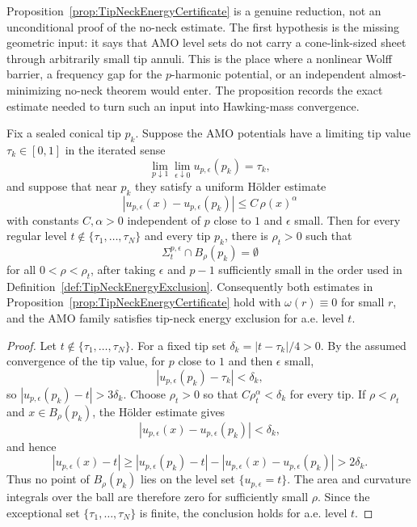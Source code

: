 \begin{remark}\label{rem:TipNeckCertificateStatus}
Proposition~\ref{prop:TipNeckEnergyCertificate} is a genuine reduction, not an
unconditional proof of the no-neck estimate.  The first hypothesis is the
missing geometric input: it says that AMO level sets do not carry a
cone-link-sized sheet through arbitrarily small tip annuli.  This is the
place where a nonlinear Wolff barrier, a frequency gap for the \(p\)-harmonic
potential, or an independent almost-minimizing no-neck theorem would enter.
The proposition records the exact estimate needed to turn such an input into
Hawking-mass convergence.
\end{remark}

\begin{proposition}
\label{prop:TipValueSeparationNoNeck}
Fix a sealed conical tip \(p_k\).  Suppose the AMO potentials have a limiting
tip value \(\tau_k\in[0,1]\) in the iterated sense
\[
    \lim_{p\downarrow1}\lim_{\epsilon\downarrow0}
    u_{p,\epsilon}(p_k)=\tau_k,
\]
and suppose that near \(p_k\) they satisfy a uniform H\"older estimate
\[
    |u_{p,\epsilon}(x)-u_{p,\epsilon}(p_k)|
    \le C\,\rho(x)^\alpha
\]
with constants \(C,\alpha>0\) independent of \(p\) close to \(1\) and
\(\epsilon\) small.  Then for every regular level
\(t\notin\{\tau_1,\ldots,\tau_N\}\) and every tip \(p_k\), there is
\(\rho_t>0\) such that
\[
    \Sigma^{p,\epsilon}_t\cap B_\rho(p_k)=\emptyset
\]
for all \(0<\rho<\rho_t\), after taking \(\epsilon\) and \(p-1\) sufficiently
small in the order used in Definition~\ref{def:TipNeckEnergyExclusion}.
Consequently both estimates in Proposition~\ref{prop:TipNeckEnergyCertificate}
hold with \(\omega(r)\equiv0\) for small \(r\), and the AMO family satisfies
tip-neck energy exclusion for a.e. level \(t\).
\end{proposition}

\begin{proof}
Let \(t\notin\{\tau_1,\ldots,\tau_N\}\).  For a fixed tip set
\(\delta_k=|t-\tau_k|/4>0\).  By the assumed convergence of the tip value,
for \(p\) close to \(1\) and then \(\epsilon\) small,
\[
    |u_{p,\epsilon}(p_k)-\tau_k|<\delta_k,
\]
so \(|u_{p,\epsilon}(p_k)-t|>3\delta_k\).  Choose
\(\rho_t>0\) so that \(C\rho_t^\alpha<\delta_k\) for every tip.  If
\(\rho<\rho_t\) and \(x\in B_\rho(p_k)\), the H\"older estimate gives
\[
    |u_{p,\epsilon}(x)-u_{p,\epsilon}(p_k)|<\delta_k,
\]
and hence
\[
    |u_{p,\epsilon}(x)-t|
    \ge |u_{p,\epsilon}(p_k)-t|
      - |u_{p,\epsilon}(x)-u_{p,\epsilon}(p_k)|
    >2\delta_k .
\]
Thus no point of \(B_\rho(p_k)\) lies on the level set
\(\{u_{p,\epsilon}=t\}\).  The area and curvature integrals over the ball are
therefore zero for sufficiently small \(\rho\).  Since the exceptional set
\(\{\tau_1,\ldots,\tau_N\}\) is finite, the conclusion holds for a.e. level
\(t\).
\end{proof}

